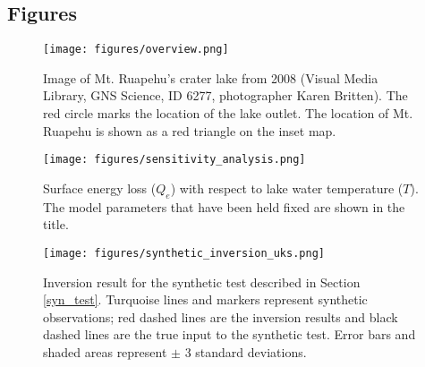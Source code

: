 \documentclass[doublespacing]{bmcart}
\begin{document}
\begin{backmatter}



\section*{Figures}

\begin{figure}[h!]
    \texttt{[image: figures/overview.png]}  
    \caption{Image of Mt. Ruapehu's crater lake from 2008 (\textcopyright Visual
        Media Library, GNS Science, ID 6277, photographer Karen Britten). The red
        circle marks the location of the lake outlet. The location of Mt. Ruapehu is
        shown as a red triangle on the inset map.}
      \label{overview}
\end{figure}

\begin{figure}[h!]
   \texttt{[image: figures/sensitivity\_analysis.png]}  
    \caption{Surface energy loss ($Q_e$) with respect to lake water temperature
             ($T$). The model parameters that have been held fixed are shown in  
             the title.}
      \label{sens}
\end{figure}
    
\begin{figure}[h!]
	\texttt{[image: figures/synthetic\_inversion\_uks.png]}  
    \caption{Inversion result for the synthetic test described in Section
        \ref{syn_test}. Turquoise lines and markers represent synthetic
        observations; red dashed lines are the inversion results and black
        dashed lines are the true input to the synthetic test. Error bars and
        shaded areas represent $\pm$ 3 standard deviations.}
  \label{syn_example}
\end{figure}


\end{backmatter}
\end{document}
